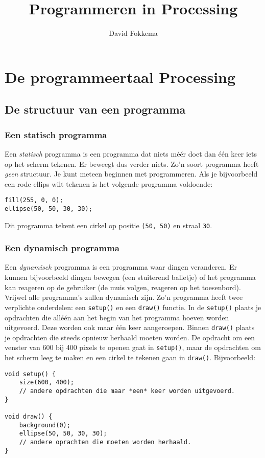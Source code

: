 \documentclass[a4paper,11pt]{report}
\title{Programmeren in Processing}
\author{David Fokkema}
\begin{document}
\maketitle

\chapter{De programmeertaal Processing}

\section{De structuur van een programma}

\subsection{Een statisch programma}

Een \emph{statisch} programma is een programma dat niets méér doet dan één
keer iets op het scherm tekenen.  Er beweegt dus verder niets.  Zo'n soort
programma heeft \emph{geen} structuur.  Je kunt meteen beginnen met
programmeren.  Als je bijvoorbeeld een rode ellips wilt tekenen is het
volgende programma voldoende:
\begin{verbatim}
fill(255, 0, 0);
ellipse(50, 50, 30, 30);
\end{verbatim}
Dit programma tekent een cirkel op positie \verb|(50, 50)| en straal
\verb|30|.


\subsection{Een dynamisch programma}

Een \emph{dynamisch} programma is een programma waar dingen veranderen.
Er kunnen bijvoorbeeld dingen bewegen (een stuiterend balletje) of het
programma kan reageren op de gebruiker (de muis volgen, reageren op het
toesenbord).  Vrijwel alle programma's zullen dynamisch zijn.  Zo'n
programma heeft twee verplichte onderdelen: een \verb|setup()| en een
\verb|draw()| functie.  In de \verb|setup()| plaats je opdrachten die
alléén aan het begin van het programma hoeven worden uitgevoerd.  Deze
worden ook maar één keer aangeroepen.  Binnen \verb|draw()| plaats je
opdrachten die steeds opnieuw herhaald moeten worden.  De opdracht om een
venster van 600 bij 400 pixels te openen gaat in \verb|setup()|, maar de
opdrachten om het scherm leeg te maken en een cirkel te tekenen gaan in
\verb|draw()|.  Bijvoorbeeld:
\begin{verbatim}
void setup() {
    size(600, 400);
    // andere opdrachten die maar *een* keer worden uitgevoerd.
}

void draw() {
    background(0);
    ellipse(50, 50, 30, 30);
    // andere oprachten die moeten worden herhaald.
}
\end{verbatim}
\end{document}
